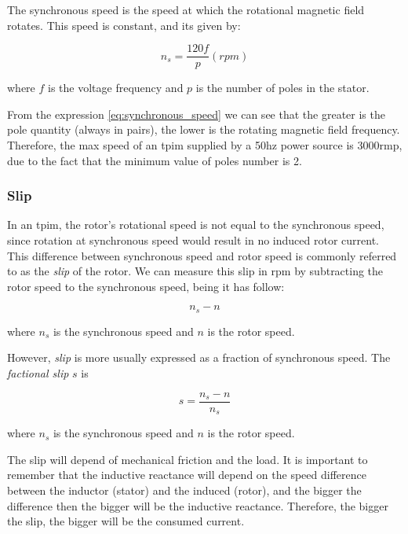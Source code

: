 The synchronous speed is the speed at which the rotational magnetic field rotates. This speed is constant, and its given by:

\begin{equation} \label{eq:synchronous_speed}
	 n_{s} = \frac{120f}{p}(rpm)
\end{equation}

where $f$ is the voltage frequency and $p$ is the number of poles in the stator.

From the expression \ref{eq:synchronous_speed} we can see that the greater is the pole quantity (always in pairs), the lower is the rotating magnetic field frequency.
Therefore, the max speed of an \acrshort{tpim} supplied by a 50hz power source is 3000rmp, due to the fact that the minimum value of poles number is 2.


\subsubsection{Slip}
In an \acrshort{tpim}, the rotor's rotational speed is not equal to the synchronous speed, since rotation at synchronous speed would result in no induced rotor current. This difference between synchronous speed and rotor speed is commonly referred to as the \emph{slip} of the rotor. We can measure this slip in rpm by subtracting the rotor speed to the synchronous speed, being it has follow:

\begin{equation} \label{eq:slip}
	 n_{s} - n
\end{equation}

where $n_{s}$ is the synchronous speed and $n$ is the rotor speed.

However, \emph{slip} is more usually expressed as a fraction of synchronous speed. The \emph{factional slip} $s$ is

\begin{equation} \label{eq:perc_slip}
	s = \frac{n_{s} - n}{n_{s}} 
\end{equation}

where $n_{s}$ is the synchronous speed and $n$ is the rotor speed.

The slip will depend of mechanical friction and the load. It is important to remember that the inductive reactance will depend on the speed difference between the inductor (stator) and the induced (rotor), and the bigger the difference then the bigger will be the inductive reactance. Therefore, the bigger the slip, the bigger will be the consumed current.

